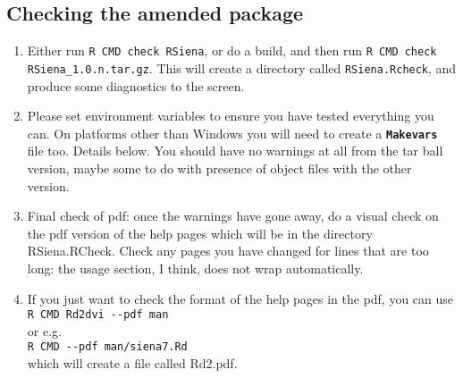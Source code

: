 \documentclass[12pt, a4paper]{article}
\renewcommand{\=}{\,=\,}
\newcommand{\+}{\,+\,}
\newcommand{\sfn}[1]{\textbf{\texttt{#1}}}
\begin{document}
\subsection{Checking the amended package}
\begin{enumerate}
\item Either run \verb|R CMD check RSiena|, or do a build, and then
  run \verb|R CMD check RSiena_1.0.n.tar.gz|. This will create a directory
  called \verb|RSiena.Rcheck|, and produce some diagnostics to the
  screen.
\item Please set environment variables to ensure you have tested everything you
  can. On platforms other than Windows you will need to create a \sfn{Makevars}
  file too. Details below. You should have no warnings at all from
  the tar ball version, maybe some to do with presence of object files with the
  other version.
\item Final check of pdf: once the warnings have gone away, do a visual check on
  the pdf version of the help pages which will be in the directory
  RSiena.RCheck. Check any pages you have changed for lines that are too long:
  the usage section, I think, does not wrap automatically.
\item If you just want to check the format of the help pages in the pdf, you can
  use \\ \verb|R CMD Rd2dvi --pdf man| \\ or e.g.\ \\
  \verb|R CMD --pdf man/siena7.Rd|\\ which will create a file called Rd2.pdf.
\end{enumerate}
\end{document}
